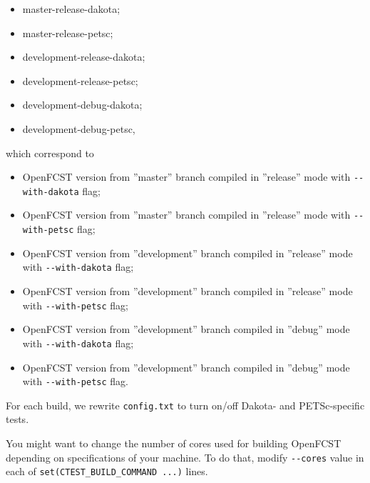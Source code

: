 \begin{itemize}
\item master-release-dakota;
\item master-release-petsc;
\item development-release-dakota;
\item development-release-petsc;
\item development-debug-dakota;
\item development-debug-petsc,
\end{itemize}

\noindent which correspond to 

\begin{itemize}
\item OpenFCST version from ''master'' branch compiled in ''release'' mode with \verb!--with-dakota! flag;
\item OpenFCST version from ''master'' branch compiled in ''release'' mode with \verb!--with-petsc! flag;
\item OpenFCST version from ''development'' branch compiled in ''release'' mode with \verb!--with-dakota! flag;
\item OpenFCST version from ''development'' branch compiled in ''release'' mode with \verb!--with-petsc! flag;
\item OpenFCST version from ''development'' branch compiled in ''debug'' mode with \verb!--with-dakota! flag;
\item OpenFCST version from ''development'' branch compiled in ''debug'' mode with \verb!--with-petsc! flag.
\end{itemize}

For each build, we rewrite \verb!config.txt! to turn on/off Dakota- and PETSc-specific tests.

You might want to change the number of cores used for building OpenFCST depending on specifications of your machine. To do that, modify \verb!--cores! value in each of  \verb!set(CTEST_BUILD_COMMAND ...)! lines.


